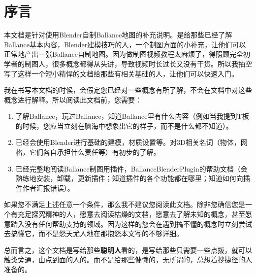 \section*{序言}

本文档是针对使用Blender自制Ballance地图的补充说明。是给那些已经了解Ballance基本内容，Blender建模技巧的人，一个制图方面的小补充，让他们可以正常地产出一张Ballance自制地图。因为做制图视频教程太麻烦了，得照顾完全初学者的制图人，很多概念都得从头讲，导致视频时长过长又没有干货。所以我抽空写了这样一个短小精悍的文档给那些有相关基础的人，让他们可以快速入门。

我在书写本文档的时候，会假定您已经对一些概念有所了解，不会在文档中对这些概念进行解释。所以阅读此文档前，您需要：

\begin{enumerate}

\item 了解Ballance，玩过Ballance，知道Ballance里有什么内容（例如当我提到T板的时候，您应当立刻在脑海中想象出它的样子，而不是什么都不知道）。

\item 已经会使用Blender进行基础的建模，材质设置等。对3D相关名词（物体，网格，它们各自承担什么责任等）有初步的了解。

\item 已经完整地阅读Ballance制图用插件，BallanceBlenderPlugin的帮助文档（会熟练地安装，卸载，更新插件；知道插件的各个功能都在哪里；知道如何向插件作者汇报错误）。

\end{enumerate}

如果您不满足上述任意一个条件，那么我不建议您阅读此文档。除非您确信您是一个有充足探究精神的人，愿意去阅读枯燥的文档，愿意去了解未知的概念，甚至愿意踏入没有任何帮助支持的领域。因为这样的您会在遇到搞不懂的概念时立刻尝试去搞懂它，而不是怨天尤人地在那抱怨本文写的不够详细。

总而言之，这个文档是写给那些\textbf{聪明人}看的，是写给那些只需要一些点拨，就可以触类旁通，由点到面的人的。而不是给那些慵懒的，无所谓的，总想着抄捷径的人准备的。
